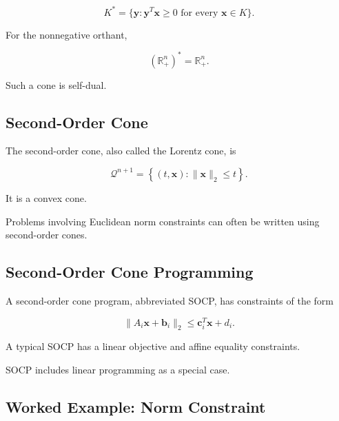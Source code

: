 \[
\boxed{
K^*
=
\{
\mathbf{y}:
\mathbf{y}^T\mathbf{x}\geq0
\text{ for every }
\mathbf{x}\in K
\}.
}
\]

For the nonnegative orthant,

\[
\boxed{
(\mathbb{R}_+^n)^*
=
\mathbb{R}_+^n.
}
\]

Such a cone is self-dual.

\subsection{Second-Order Cone}
\label{subsec:second-order-cone}

The second-order cone, also called the Lorentz cone, is

\[
\boxed{
\mathcal{Q}^{n+1}
=
\left\{
(t,\mathbf{x}):
\|\mathbf{x}\|_2\leq t
\right\}.
}
\]

It is a convex cone.

Problems involving Euclidean norm constraints can often be written using
second-order cones.

\subsection{Second-Order Cone Programming}
\label{subsec:second-order-cone-programming}

A second-order cone program, abbreviated SOCP, has constraints of the form

\[
\boxed{
\|
A_i\mathbf{x}
+
\mathbf{b}_i
\|_2
\leq
\mathbf{c}_i^T\mathbf{x}
+
d_i.
}
\]

A typical SOCP has a linear objective and affine equality constraints.

SOCP includes linear programming as a special case.

\subsection{Worked Example: Norm Constraint}
\label{subsec:worked-socp-norm}


